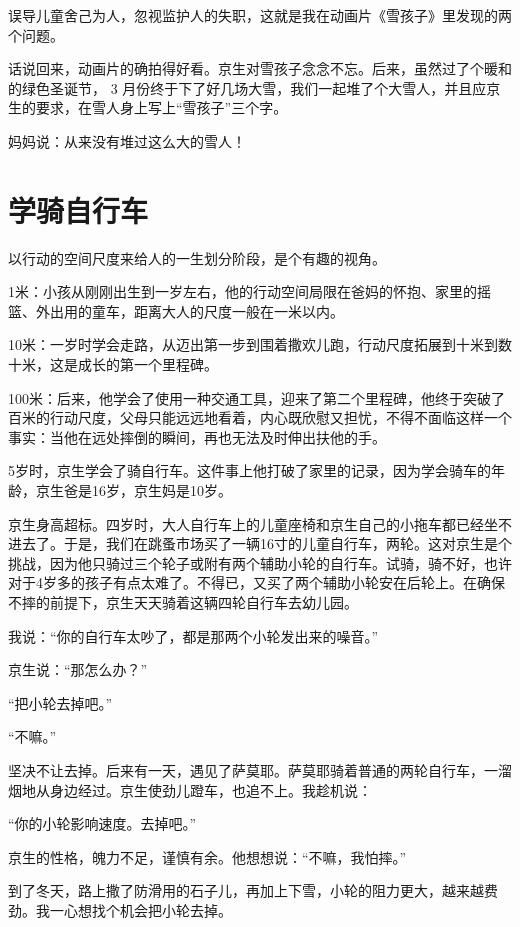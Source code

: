 \documentclass[twoside,openright,headings=optiontohead]{ctexbook} %
\begin{document}
{误导儿童舍己为人，忽视监护人的失职，这就是我在动画片《雪孩子》里发现的两个问题。

话说回来，动画片的确拍得好看。京生对雪孩子念念不忘。后来，虽然过了个暖和的绿色圣诞节，
3
月份终于下了好几场大雪，我们一起堆了个大雪人，并且应京生的要求，在雪人身上写上``雪孩子''三个字。

妈妈说：从来没有堆过这么大的雪人！

\chapter*{学骑自行车}\label{bike}

以行动的空间尺度来给人的一生划分阶段，是个有趣的视角。

1米：小孩从刚刚出生到一岁左右，他的行动空间局限在爸妈的怀抱、家里的摇篮、外出用的童车，距离大人的尺度一般在一米以内。

10米：一岁时学会走路，从迈出第一步到围着撒欢儿跑，行动尺度拓展到十米到数十米，这是成长的第一个里程碑。

100米：后来，他学会了使用一种交通工具，迎来了第二个里程碑，他终于突破了百米的行动尺度，父母只能远远地看着，内心既欣慰又担忧，不得不面临这样一个事实：当他在远处摔倒的瞬间，再也无法及时伸出扶他的手。

5岁时，京生学会了骑自行车。这件事上他打破了家里的记录，因为学会骑车的年龄，京生爸是16岁，京生妈是10岁。

京生身高超标。四岁时，大人自行车上的儿童座椅和京生自己的小拖车都已经坐不进去了。于是，我们在跳蚤市场买了一辆16寸的儿童自行车，两轮。这对京生是个挑战，因为他只骑过三个轮子或附有两个辅助小轮的自行车。试骑，骑不好，也许对于4岁多的孩子有点太难了。不得已，又买了两个辅助小轮安在后轮上。在确保不摔的前提下，京生天天骑着这辆四轮自行车去幼儿园。

我说：``你的自行车太吵了，都是那两个小轮发出来的噪音。''

京生说：``那怎么办？''

``把小轮去掉吧。''

``不嘛。''

坚决不让去掉。后来有一天，遇见了萨莫耶。萨莫耶骑着普通的两轮自行车，一溜烟地从身边经过。京生使劲儿蹬车，也追不上。我趁机说：

``你的小轮影响速度。去掉吧。''

京生的性格，魄力不足，谨慎有余。他想想说：``不嘛，我怕摔。''

到了冬天，路上撒了防滑用的石子儿，再加上下雪，小轮的阻力更大，越来越费劲。我一心想找个机会把小轮去掉。

}
\end{document}
